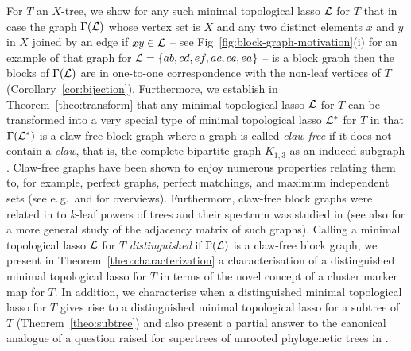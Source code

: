 For $T$ an $X$-tree, we show for any such minimal topological lasso ${\mathcal L}$ for
$T$ that in case the graph $\Gamma({\mathcal L})$ whose vertex set is $X$ and any two
distinct elements $x$ and $y$ in $X$ joined by an edge if $xy\in {\mathcal L}$ -- see
Fig~\ref{fig:block-graph-motivation}(i) for an example of that graph for
${\mathcal L}=\{ab,cd,ef,ac,ce,ea\}$ -- is a block graph then the blocks of
$\Gamma({\mathcal L})$ are in one-to-one correspondence with the non-leaf vertices of
$T$ (Corollary~\ref{cor:bijection}).  Furthermore, we establish in
Theorem~\ref{theo:transform} that any minimal topological lasso ${\mathcal L}$ for $T$
can be transformed into a very special type of minimal topological lasso
${\mathcal L}^*$ for $T$ in that $\Gamma({\mathcal L}^*)$ is a claw-free block graph where a
graph is called {\em claw-free} if it does not contain a {\em claw}, that is,
the complete bipartite graph $K_{1,3}$ as an induced subgraph \cite{H72}.
Claw-free graphs have been shown to enjoy numerous properties relating them
to, for example, perfect graphs, perfect matchings, and maximum independent
sets (see e.\,g.\,\cite{FFZ97} and \cite{CFHV12} for overviews).  Furthermore,
claw-free block graphs were related in \cite{BL09} to $k$-leaf powers of trees
and their spectrum was studied in \cite{GS01, MSST06} (see also \cite{BR13}
for a more general study of the adjacency matrix of such graphs).  Calling a
minimal topological lasso ${\mathcal L}$ for $T$ {\em distinguished} if $\Gamma({\mathcal L})$
is a claw-free block graph, we present in Theorem~\ref{theo:characterization}
a characterisation of a distinguished minimal topological lasso for $T$ in
terms of the novel concept of a cluster marker map for $T$. In addition, we
characterise when a distinguished minimal topological lasso for $T$ gives rise
to a distinguished minimal topological lasso for a subtree of $T$
(Theorem~\ref{theo:subtree}) and also present a partial answer to the
canonical analogue of a question raised for supertrees of unrooted
phylogenetic trees in \cite{DHS11}.

